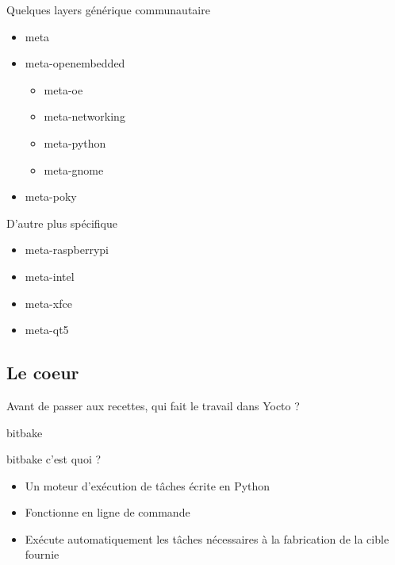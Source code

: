 \documentclass[compress]{smilebeamer}
\begin{document}
\begin{frame}
Quelques layers générique communautaire
\begin{itemize}
	\item meta
	\item meta-openembedded
	\begin{itemize}
		\item meta-oe
		\item meta-networking
		\item meta-python
		\item meta-gnome
	\end{itemize}
	\item meta-poky
\end{itemize}
D'autre plus spécifique
\begin{itemize}
	\item meta-raspberrypi
	\item meta-intel
	\item meta-xfce
	\item meta-qt5
\end{itemize}
\end{frame}


%
%
\subsection{Le coeur}

\begin{frame}
\begin{center}
\huge{Avant de passer aux recettes, qui fait le travail dans Yocto ?}
\end{center}
\end{frame}

\begin{frame}{bitbake}
\begin{block}{bitbake c'est quoi ?}
\begin{itemize}
	\item Un moteur d'exécution de tâches écrite en Python
	\item Fonctionne en ligne de commande
	\item Exécute automatiquement les tâches nécessaires à la fabrication de la cible fournie
\end{itemize}
\end{block}
\end{frame}
\end{document}
